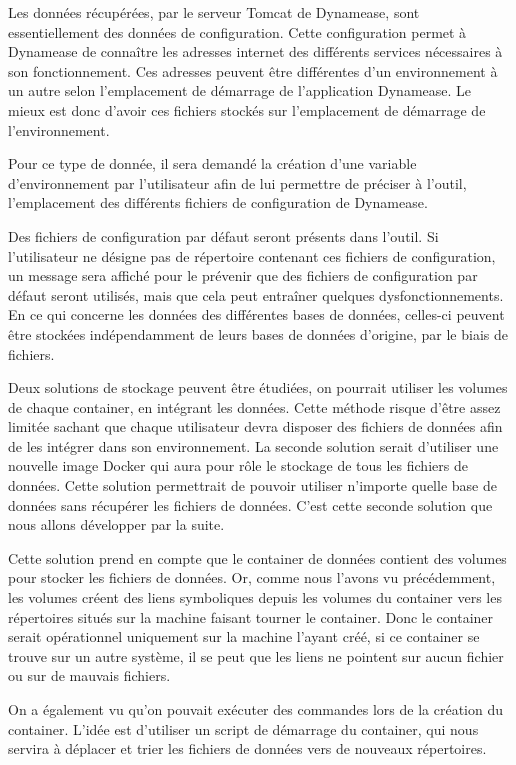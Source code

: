 Les données récupérées, par le serveur Tomcat de Dynamease, sont essentiellement des données de configuration. Cette configuration permet à Dynamease de connaître les adresses internet des différents services nécessaires à son fonctionnement. Ces adresses peuvent être différentes d'un environnement à un autre selon l'emplacement de démarrage de l'application Dynamease. Le mieux est donc d'avoir ces fichiers stockés sur l'emplacement de démarrage de l'environnement.

Pour ce type de donnée, il sera demandé la création d'une variable d'environnement par l'utilisateur afin de lui permettre de préciser à l'outil, l'emplacement des différents fichiers de configuration de Dynamease.

Des fichiers de configuration par défaut seront présents dans l'outil. Si l'utilisateur ne désigne pas de répertoire contenant ces fichiers de configuration, un message sera affiché pour le prévenir que des fichiers de configuration par défaut seront utilisés, mais que cela peut entraîner quelques dysfonctionnements.\\

En ce qui concerne les données des différentes bases de données, celles-ci peuvent être stockées indépendamment de leurs bases de données d'origine, par le biais de fichiers. 

Deux solutions de stockage peuvent être étudiées, on pourrait utiliser les volumes de chaque container, en intégrant les données. Cette méthode risque d'être assez limitée sachant que chaque utilisateur devra disposer des fichiers de données afin de les intégrer dans son environnement. La seconde solution serait d'utiliser une nouvelle image Docker qui aura pour rôle le stockage de tous les fichiers de données. Cette solution permettrait de pouvoir utiliser n'importe quelle base de données sans récupérer les fichiers de données. C'est cette seconde solution que nous allons développer par la suite.

Cette solution prend en compte que le container de données contient des volumes pour stocker les fichiers de données. Or, comme nous l'avons vu précédemment, les volumes créent des liens symboliques depuis les volumes du container vers les répertoires situés sur la machine faisant tourner le container. Donc le container serait opérationnel uniquement sur la machine l'ayant créé, si ce container se trouve sur un autre système, il se peut que les liens ne pointent sur aucun fichier ou sur de mauvais fichiers.

On a également vu qu'on pouvait exécuter des commandes lors de la création du container. L'idée est d'utiliser un script de démarrage du container, qui nous servira à déplacer et trier les fichiers de données vers de nouveaux répertoires.


